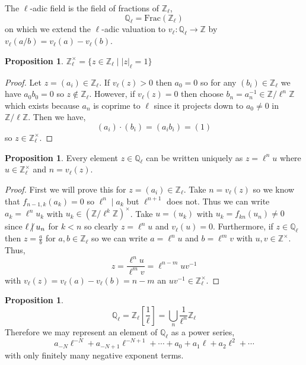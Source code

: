 \documentclass[12pt]{article}
\newcommand{\divides}{\mid}
\newcommand{\ndivides}{\centernot \mid}
\newcommand{\Z}{\mathbb{Z}}
\newcommand{\Q}{\mathbb{Q}}
\theoremstyle{remark}
\theoremstyle{definition}
\newtheorem{proposition}[theorem]{Proposition}
\newenvironment{definition}[1][Definition:]{\begin{trivlist}
\item[\hskip \labelsep {\bfseries #1}]}{\end{trivlist}}
\begin{document}
\begin{definition}
The $\ell$-adic field is the field of fractions of $\Z_{\ell}$,
\[ \Q_{\ell} = \mathrm{Frac}(\Z_{\ell}) \]
on which we extend the $\ell$-adic valuation to $v_{\ell} : \Q_{\ell} \to \Z$ by $v_{\ell}(a/b) = v_{\ell}(a) - v_{\ell}(b)$. 
\end{definition}

\begin{proposition}
$\Z_{\ell}^\times = \{ z \in \Z_{\ell} \mid |z|_{\ell} = 1 \}$
\end{proposition}

\begin{proof}
Let $z = (a_i) \in \Z_\ell$. If $v_{\ell}(z) > 0$ then $a_0 = 0$ so for any $(b_i) \in \Z_{\ell}$ we have $a_0 b_0 = 0$ so $z \notin \Z_{\ell}$. However, if $v_{\ell}(z) = 0$ then choose $b_n = a_n^{-1} \in \Z / \ell^n \Z$ which exists because $a_n$ is coprime to $\ell$ since it projects down to $a_0 \neq 0$ in $\Z / \ell \Z$. Then we have,
\[ (a_i) \cdot (b_i) = (a_i b_i) = (1) \]
so $z \in \Z_{\ell}^\times$.  
\end{proof}

\begin{proposition}
Every element $z \in \Q_{\ell}$ can be written uniquely as $z = \ell^n u$ where $u \in \Z_{\ell}^\times$ and $n = v_{\ell}(z)$. 
\end{proposition}

\begin{proof}
First we will prove this for $z = (a_i) \in \Z_{\ell}$. Take $n = v_{\ell}(z)$ so we know that $f_{n-1, k}(a_{k}) = 0$ so $\ell^n \divides a_k$ but $\ell^{n+1}$ does not. Thus we can write $a_k = \ell^n u_k$ with $u_k \in (\Z / \ell^k \Z)^\times$. Take $u = (u_k)$ with $u_k = f_{k n}(u_n) \neq 0$ since $\ell \ndivides u_n$ for $k < n$ so clearly $z = \ell^n u$ and $v_{\ell}(u) = 0$. Furthermore, if $z \in \Q_{\ell}$ then $z = \frac{a}{b}$ for $a,b \in \Z_{\ell}$ so we can write $a = \ell^n u$ and $b = \ell^m v$ with $u,v \in \Z^\times$. Thus,
\[ z = \frac{\ell^n u}{\ell^m v} = \ell^{n-m} u v^{-1} \]
with $v_{\ell}(z) = v_{\ell}(a) - v_{\ell}(b) = n - m$ an $u v^{-1} \in \Z_{\ell}^\times$.  
\end{proof}

\begin{proposition}
\[ \Q_{\ell} = \Z_{\ell}\left[ \frac{1}{\ell} \right] = \bigcup_n \frac{1}{\ell^n} \Z_{\ell} \]
Therefore we may represent an element of $\Q_{\ell}$ as a power series,
\[ a_{-N} \ell^{-N} + a_{-N + 1} \ell^{-N + 1} + \cdots + a_0 + a_1 \ell + a_2 \ell^2 + \cdots \]
with only finitely many negative exponent terms.
\end{proposition}
\end{document}
